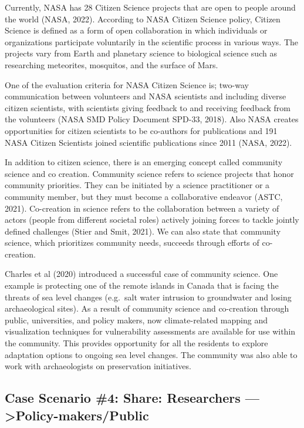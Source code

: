 \documentclass[
  letterpaper,
  DIV=11,
  numbers=noendperiod]{scrreport}
\begin{document}
Currently, NASA has 28 Citizen Science projects that are open to people
around the world (NASA, 2022). According to NASA Citizen Science policy,
Citizen Science is defined as a form of open collaboration in which
individuals or organizations participate voluntarily in the scientific
process in various ways. The projects vary from Earth and planetary
science to biological science such as researching meteorites, mosquitos,
and the surface of Mars.

One of the evaluation criteria for NASA Citizen Science is; two-way
communication between volunteers and NASA scientists and including
diverse citizen scientists, with scientists giving feedback to and
receiving feedback from the volunteers (NASA SMD Policy Document SPD-33,
2018). Also NASA creates opportunities for citizen scientists to be
co-authors for publications and 191 NASA Citizen Scientists joined
scientific publications since 2011 (NASA, 2022).

In addition to citizen science, there is an emerging concept called
community science and co creation. Community science refers to science
projects that honor community priorities. They can be initiated by a
science practitioner or a community member, but they must become a
collaborative endeavor (ASTC, 2021). Co-creation in science refers to
the collaboration between a variety of actors (people from different
societal roles) actively joining forces to tackle jointly defined
challenges (Stier and Smit, 2021). We can also state that community
science, which prioritizes community needs, succeeds through efforts of
co-creation.

Charles et al (2020) introduced a successful case of community science.
One example is protecting one of the remote islands in Canada that is
facing the threats of sea level changes (e.g.~salt water intrusion to
groundwater and losing archaeological sites). As a result of community
science and co-creation through public, universities, and policy makers,
now climate-related mapping and visualization techniques for
vulnerability assessments are available for use within the community.
This provides opportunity for all the residents to explore adaptation
options to ongoing sea level changes. The community was also able to
work with archaeologists on preservation initiatives.

\hypertarget{case-scenario-4-share-researchers-policy-makerspublic}{%
\subsection{Case Scenario \#4: Share: Researchers
---\textgreater Policy-makers/Public}\label{case-scenario-4-share-researchers-policy-makerspublic}}
\end{document}
